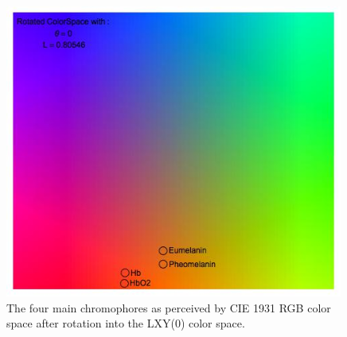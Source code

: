 \begin{figure}[h!]
  \centering
    \includegraphics[width=0.99\textwidth]{Chapter1/Figs/ChromophoresYAB.jpg}
    \caption{The four main chromophores as perceived by CIE 1931 RGB color space after rotation into the LXY(0) color space.}  \label{fig:ChromophoresYAB}
\end{figure}